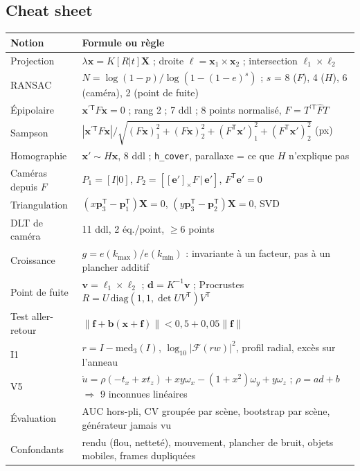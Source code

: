 \documentclass[11pt,a4paper]{article}
\newcommand{\T}{^{\mathsf T}}
\newcommand{\x}{\mathbf{x}}
\newcommand{\X}{\mathbf{X}}
\begin{document}
\subsection{Cheat sheet}
\begin{center}\small
\begin{tabular}{p{4.2cm}p{10.8cm}}
\toprule
Notion & Formule ou règle \\
\midrule
Projection & $\lambda\x=K[R|t]\X$ ; droite $\boldsymbol\ell=\x_1\times\x_2$ ; intersection $\boldsymbol\ell_1\times\boldsymbol\ell_2$ \\
RANSAC & $N=\log(1-p)/\log(1-(1-e)^s)$ ; $s$ = 8 ($F$), 4 ($H$), 6 (caméra), 2 (point de fuite) \\
Épipolaire & $\x^{\prime\mathsf{T}} F\x=0$ ; rang 2 ; 7 ddl ; 8 points normalisé, $F=T^{\prime\mathsf{T}}\hat FT$ \\
Sampson & $|\x^{\prime\mathsf{T}} F\x|/\sqrt{(F\x)_1^2+(F\x)_2^2+(F\T\x')_1^2+(F\T\x')_2^2}$ (px) \\
Homographie & $\x'\sim H\x$, 8 ddl ; \texttt{h\_cover}, parallaxe = ce que $H$ n'explique pas \\
Caméras depuis $F$ & $P_1=[I|0]$, $P_2=[[\mathbf e']_\times F\,|\,\mathbf e']$, $F\T\mathbf e'=0$ \\
Triangulation & $(x\mathbf p_3\T-\mathbf p_1\T)\X=0$, $(y\mathbf p_3\T-\mathbf p_2\T)\X=0$, SVD \\
DLT de caméra & 11 ddl, 2 éq./point, $\ge6$ points \\
Croissance & $g=e(k_{\max})/e(k_{\min})$ : invariante à un facteur, pas à un plancher additif \\
Point de fuite & $\mathbf v=\boldsymbol\ell_1\times\boldsymbol\ell_2$ ; $\mathbf d=K^{-1}\mathbf v$ ; Procrustes $R=U\,\mathrm{diag}(1,1,\det UV\T)V\T$ \\
Test aller-retour & $\|\mathbf f+\mathbf b(\x+\mathbf f)\|<0{,}5+0{,}05\|\mathbf f\|$ \\
I1 & $r=I-\mathrm{med}_3(I)$, $\log_{10}|\mathcal F(rw)|^2$, profil radial, excès sur l'anneau \\
V5 & $\dot u=\rho(-t_x+xt_z)+xy\omega_x-(1+x^2)\omega_y+y\omega_z$ ; $\rho=ad+b$ $\Rightarrow$ 9 inconnues linéaires \\
Évaluation & AUC hors-pli, CV groupée par scène, bootstrap par scène, générateur jamais vu \\
Confondants & rendu (flou, netteté), mouvement, plancher de bruit, objets mobiles, frames dupliquées \\
\bottomrule
\end{tabular}
\end{center}
\end{document}
